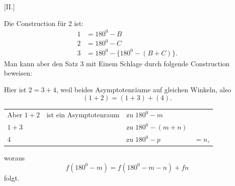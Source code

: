 %
\begin{center}[II.]\end{center}
Die Construction für 2 ist:
\[
\begin{aligned}
1&=180^{0}-B\\
2&=180^{0}-C\\
3&=180^{0}-\{180^{0}-(B+C)\}.
\end{aligned}
\]
Man kann aber den Satz 3 mit Einem Schlage durch folgende Construction beweisen:
\begin{center}\hspace{.5em}\end{center}
Hier ist $2=3+4$, weil beides Asymptotenräume auf gleichen Winkeln, also
\[
(1+2)=(1+3)+(4).
\]
\begin{center}
\begin{tabular}{@{}llll@{}}
Aber $1+2$&ist ein Asymptotenraum&zu $180^{0}-m$&\\
\hspace{2em}$1+3$&&zu $180^{0}-(m+n)$&\\
\hspace{2em}$4$&&zu $180^{0}-p$&$=n$,
\end{tabular}
\end{center}
\noindent woraus
\[
f(180^{0}-m)=f(180^{0}-m-n)+fn
\]
folgt.

